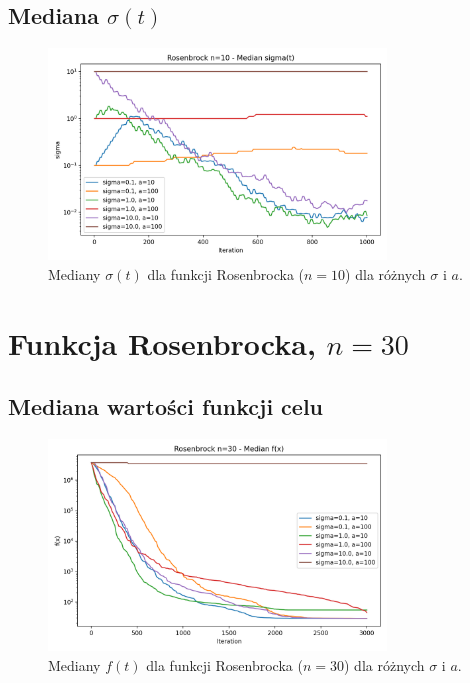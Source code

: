 \documentclass[a4paper,12pt]{article}
\begin{document}
\subsection{Mediana $\sigma(t)$}
\begin{figure}[H]
    \centering
    \includegraphics[width=0.8\textwidth]{charts/Rosenbrock_n10_all_sigmas.png}
    \caption{Mediany $\sigma(t)$ dla funkcji Rosenbrocka ($n=10$) dla różnych $\sigma$ i $a$.}
\end{figure}

\section{Funkcja Rosenbrocka, $n=30$}
\subsection{Mediana wartości funkcji celu}
\begin{figure}[H]
    \centering
    \includegraphics[width=0.8\textwidth]{charts/Rosenbrock_n30_all_medians.png}
    \caption{Mediany $f(t)$ dla funkcji Rosenbrocka ($n=30$) dla różnych $\sigma$ i $a$.}
\end{figure}
\end{document}
